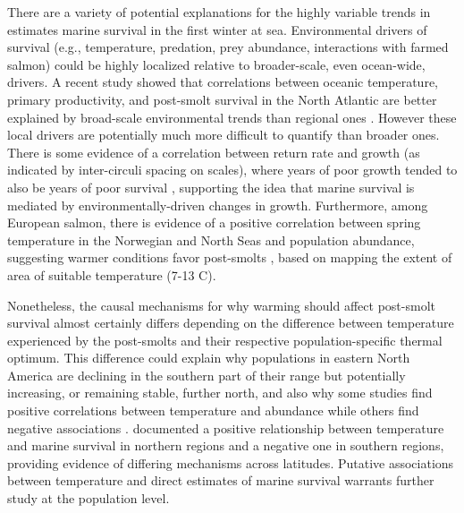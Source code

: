 \documentclass[12pt]{article}
\begin{document}
There are a variety of potential explanations for the highly variable trends
in estimates marine survival in the first winter at sea.
Environmental drivers of survival (e.g., temperature, predation, prey abundance, 
interactions with farmed salmon) could be highly localized 
relative to broader-scale, even ocean-wide, drivers.
A recent study showed that correlations between oceanic temperature, primary
productivity, and post-smolt survival in the North Atlantic
are better explained by broad-scale environmental trends than regional ones
\citep{Olmos2020}.
However these local drivers are potentially much more difficult to quantify than 
broader ones.
There is some evidence of a correlation between return rate and growth (as
indicated by inter-circuli spacing on scales), where years of poor growth
tended to also be years of poor survival \citep{Friedland1993}, supporting the
idea that marine survival is mediated by environmentally-driven changes in growth.
Furthermore, among European salmon, there is evidence of a positive correlation
between spring temperature in the Norwegian and North Seas and population abundance, 
suggesting warmer
conditions favor post-smolts \citep{Friedland1998}, based on mapping the
extent of area of suitable temperature (7-13 \textdegree C).

Nonetheless, the causal mechanisms for why warming should affect post-smolt
survival almost certainly differs depending on the difference between
temperature experienced by the post-smolts and their respective
population-specific thermal optimum. 
This difference could explain why populations in eastern North America are
declining in the southern part of their range but potentially increasing, or
remaining stable,
further north, and also why some studies find positive correlations between
temperature and abundance \citep{Friedland1998, Friedland1998b, Jonsson2004}
while others find negative associations \citep{Friedland1993, Todd2008}.
\citet{Olmos2020} documented a positive relationship between temperature and marine survival 
in northern regions and a negative one in southern regions, providing 
evidence of differing mechanisms across latitudes.
Putative associations between temperature and direct estimates of marine
survival warrants further study at the population level.
\end{document}
